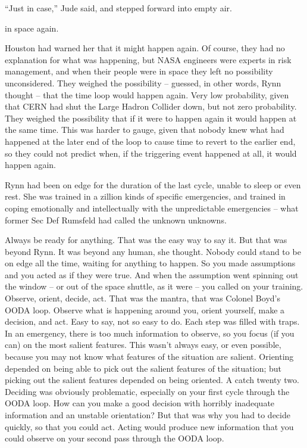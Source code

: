 ``Just in case,'' Jude said, and stepped forward into empty air.




 in space again.

Houston had warned her that it might happen again. Of course, they had no explanation for what was happening, but NASA engineers were experts in risk management, and when their people were in space they left no possibility unconsidered. They weighed the possibility – guessed, in other words, Rynn thought – that the time loop would happen again. Very low probability, given that CERN had shut the Large Hadron Collider down, but not zero probability. They weighed the possibility that if it were to happen again it would happen at the same time. This was harder to gauge, given that nobody knew what had happened at the later end of the loop to cause time to revert to the earlier end, so they could not predict when, if the triggering event happened at all, it would happen again.

Rynn had been on edge for the duration of the last cycle, unable to sleep or even rest. She was trained in a zillion kinds of specific emergencies, and trained in coping emotionally and intellectually with the unpredictable emergencies – what former Sec Def Rumsfeld had called the unknown unknowns.

Always be ready for anything. That was the easy way to say it. But that was beyond Rynn. It was beyond any human, she thought. Nobody could stand to be on edge all the time, waiting for anything to happen. So you made assumptions and you acted as if they were true. And when the assumption went spinning out the window – or out of the space shuttle, as it were – you called on your training. Observe, orient, decide, act. That was the mantra, that was Colonel Boyd's OODA loop. Observe what is happening around you, orient yourself, make a decision, and act. Easy to say, not so easy to do. Each step was filled with traps. In an emergency, there is too much information to observe, so you focus (if you can) on the most salient features. This wasn't always easy, or even possible, because you may not know what features of the situation are salient. Orienting depended on being able to pick out the salient features of the situation; but picking out the salient features depended on being oriented. A catch twenty two. Deciding was obviously problematic, especially on your first cycle through the OODA loop. How can you make a good decision with horribly inadequate information and an unstable orientation? But that was why you had to decide quickly, so that you could act. Acting would produce new information that you could observe on your second pass through the OODA loop.

